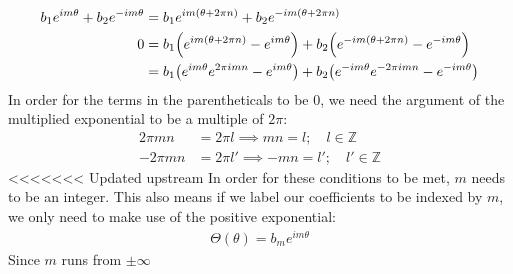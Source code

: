 \documentclass[12pt]{article}
\begin{document}
\begin{align*}
  b_1e^{im\theta}+b_2e^{-im\theta}&=
  b_1e^{im(\theta+2\pi n)}+b_2e^{-im(\theta+2\pi n)}\\
  0&=b_1\qty(e^{im(\theta+2\pi n)}-e^{im\theta})
  +b_2\qty(e^{-im(\theta+2\pi n)}-e^{-im\theta})\\
  &=b_1\qty(e^{im\theta}e^{2\pi imn}-e^{im\theta})
  +b_2\qty(e^{-im\theta}e^{-2\pi imn}-e^{-im\theta})
\end{align*}
In order for the terms in the parentheticals to be $0$, we need the argument of the multiplied exponential to be a multiple of $2\pi$:
\begin{align*}
  2\pi mn&=2\pi l\implies m n = l;\quad l\in\mathbb{Z}\\
  -2\pi mn&=2\pi l'\implies -m n = l';\quad l'\in\mathbb{Z}
\end{align*}
<<<<<<< Updated upstream
In order for these conditions to be met, $m$ needs to be an integer. This also means if we label our coefficients to be indexed by $m$, we only need to make use of the positive exponential:
\begin{align*}
  \Theta(\theta)=b_me^{im\theta}
\end{align*}
Since $m$ runs from $\pm\infty$
\end{document}
